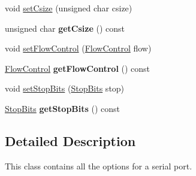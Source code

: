 \begin{DoxyCompactItemize}
\item 
void \hyperlink{class_serial_options_a4c4cadb650cafdc25353a9588e08e1ce}{set\-Csize} (unsigned char csize)
\item 
\hypertarget{class_serial_options_a28bcc690639f8f14992392c10f774251}{unsigned char {\bfseries get\-Csize} () const }\label{class_serial_options_a28bcc690639f8f14992392c10f774251}

\item 
void \hyperlink{class_serial_options_a91604c3ccdbff8a8b0e3ae591d3ef7de}{set\-Flow\-Control} (\hyperlink{class_serial_options_a747496555e093069ff4e943f38954c0f}{Flow\-Control} flow)
\item 
\hypertarget{class_serial_options_af76d076acaa6dd3e4cb696953e6a1581}{\hyperlink{class_serial_options_a747496555e093069ff4e943f38954c0f}{Flow\-Control} {\bfseries get\-Flow\-Control} () const }\label{class_serial_options_af76d076acaa6dd3e4cb696953e6a1581}

\item 
void \hyperlink{class_serial_options_a0c912ab2393019617ce830e0fe11b396}{set\-Stop\-Bits} (\hyperlink{class_serial_options_acdb2c9f835d6efff77acdac0ca1dd0ea}{Stop\-Bits} stop)
\item 
\hypertarget{class_serial_options_a3ceab934318f27e7367ee86f73298b79}{\hyperlink{class_serial_options_acdb2c9f835d6efff77acdac0ca1dd0ea}{Stop\-Bits} {\bfseries get\-Stop\-Bits} () const }\label{class_serial_options_a3ceab934318f27e7367ee86f73298b79}

\end{DoxyCompactItemize}


\subsection{Detailed Description}
This class contains all the options for a serial port. 

